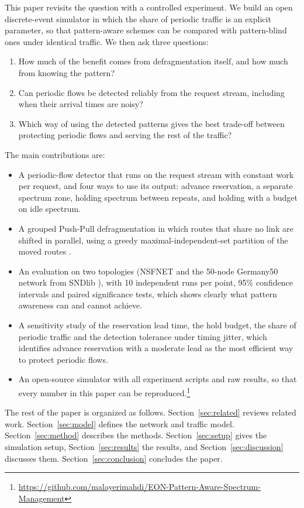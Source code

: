\documentclass[preprint,12pt]{elsarticle}
\begin{document}
This paper revisits the question with a controlled experiment. We build an open discrete-event simulator in which the share of periodic traffic is an explicit parameter, so that pattern-aware schemes can be compared with pattern-blind ones under identical traffic. We then ask three questions:
\begin{enumerate}
\item How much of the benefit comes from defragmentation itself, and how much from knowing the pattern?
\item Can periodic flows be detected reliably from the request stream, including when their arrival times are noisy?
\item Which way of using the detected patterns gives the best trade-off between protecting periodic flows and serving the rest of the traffic?
\end{enumerate}

The main contributions are:
\begin{itemize}
\item A periodic-flow detector that runs on the request stream with constant work per request, and four ways to use its output: advance reservation, a separate spectrum zone, holding spectrum between repeats, and holding with a budget on idle spectrum.
\item A grouped Push-Pull defragmentation in which routes that share no link are shifted in parallel, using a greedy maximal-independent-set partition of the moved routes \cite{shakya2013}.
\item An evaluation on two topologies (NSFNET and the 50-node Germany50 network from SNDlib \cite{orlowski2010}), with 10 independent runs per point, 95\% confidence intervals and paired significance tests, which shows clearly what pattern awareness can and cannot achieve.
\item A sensitivity study of the reservation lead time, the hold budget, the share of periodic traffic and the detection tolerance under timing jitter, which identifies advance reservation with a moderate lead as the most efficient way to protect periodic flows.
\item An open-source simulator with all experiment scripts and raw results, so that every number in this paper can be reproduced.\footnote{\url{https://github.com/malayerimahdi/EON-Pattern-Aware-Spectrum-Management}}
\end{itemize}

The rest of the paper is organized as follows. Section~\ref{sec:related} reviews related work. Section~\ref{sec:model} defines the network and traffic model. Section~\ref{sec:method} describes the methods. Section~\ref{sec:setup} gives the simulation setup, Section~\ref{sec:results} the results, and Section~\ref{sec:discussion} discusses them. Section~\ref{sec:conclusion} concludes the paper.
\end{document}
